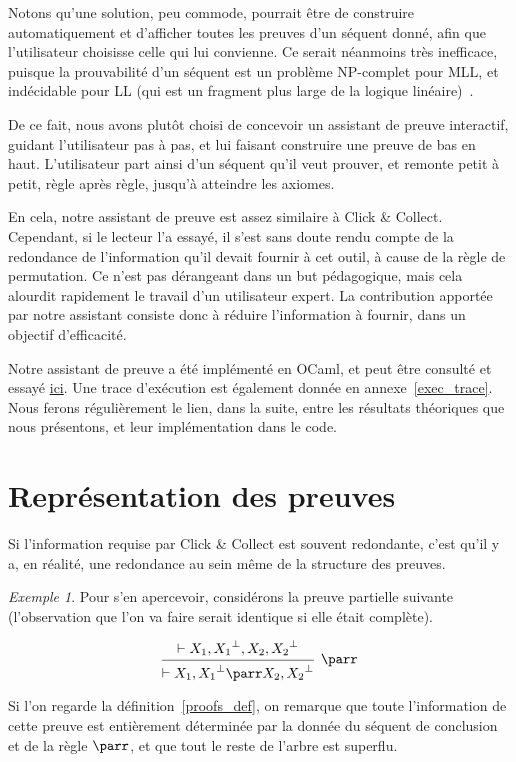 \documentclass[11pt,a4paper]{article}
\theoremstyle{plain}
\theoremstyle{definition}
\theoremstyle{remark}
\newtheorem{example}{Exemple}
\newcommand*{\orth}{^\perp}
\newcommand*{\hypv}[1]{\hypo{\vdash #1}}
\newcommand*{\parrv}[1]{\infer{1}[\ensuremath{\parr}]{\vdash #1}}
\begin{document}
Notons qu'une solution, peu commode, pourrait être de construire automatiquement et d'afficher toutes les preuves d'un séquent donné, afin que l'utilisateur choisisse celle qui lui convienne. Ce serait néanmoins très inefficace, puisque la prouvabilité d'un séquent est un problème NP-complet pour MLL, et indécidable pour LL (qui est un fragment plus large de la logique linéaire)~\cite{Lincoln_1995}.

De ce fait, nous avons plutôt choisi de concevoir un assistant de preuve interactif, guidant l'utilisateur pas à pas, et lui faisant construire une preuve de bas en haut. L'utilisateur part ainsi d'un séquent qu'il veut prouver, et remonte petit à petit, règle après règle, jusqu'à atteindre les axiomes.

En cela, notre assistant de preuve est assez similaire à Click \& Collect. Cependant, si le lecteur l'a essayé, il s'est sans doute rendu compte de la redondance de l'information qu'il devait fournir à cet outil, à cause de la règle de permutation. Ce n'est pas dérangeant dans un but pédagogique, mais cela alourdit rapidement le travail d'un utilisateur expert. La contribution apportée par notre assistant consiste donc à réduire l'information à fournir, dans un objectif d'efficacité.

Notre assistant de preuve a été implémenté en OCaml, et peut être consulté et essayé \href{https://github.com/jonas-trms/mll_prover}{ici}. Une trace d'exécution est également donnée en annexe~\ref{exec_trace}. Nous ferons régulièrement le lien, dans la suite, entre les résultats théoriques que nous présentons, et leur implémentation dans le code.

\section{Représentation des preuves}
Si l'information requise par Click \& Collect est souvent redondante, c'est qu'il y a, en réalité, une redondance au sein même de la structure des preuves.

\begin{example}
    Pour s'en apercevoir, considérons la preuve partielle suivante (l'observation que l'on va faire serait identique si elle était complète).

    \begin{equation*}
        \begin{prooftree}
            \hypv{X_1, {X_1}\orth, X_2, {X_2}\orth}
            \parrv{X_1, {X_1}\orth \parr X_2, {X_2}\orth}
        \end{prooftree}
    \end{equation*}
    

    Si l'on regarde la définition~\ref{proofs_def}, on remarque que toute l'information de cette preuve est entièrement déterminée par la donnée du séquent de conclusion et de la règle $\parr$, et que tout le reste de l'arbre est superflu.
\end{example}
\end{document}
